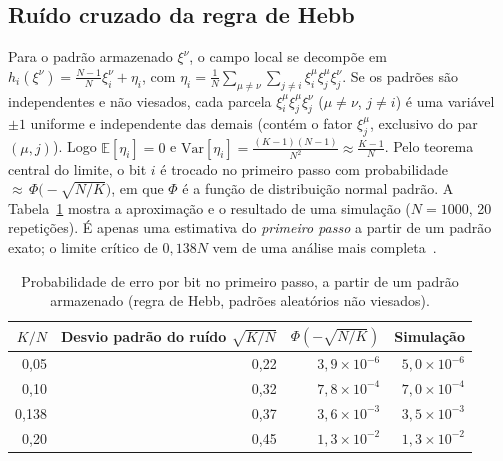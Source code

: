 \subsection{Ruído cruzado da regra de Hebb}
Para o padrão armazenado $\xi^\nu$, o campo local se decompõe em
$h_i(\xi^\nu)=\tfrac{N-1}{N}\xi_i^\nu+\eta_i$, com
$\eta_i=\tfrac1N\sum_{\mu\neq\nu}\sum_{j\neq i}\xi_i^\mu\xi_j^\mu\xi_j^\nu$. Se os padrões são independentes e não
viesados, cada parcela $\xi_i^\mu\xi_j^\mu\xi_j^\nu$ ($\mu\neq\nu$, $j\neq i$) é uma variável $\pm1$ uniforme e
independente das demais (contém o fator $\xi_j^\mu$, exclusivo do par $(\mu,j)$). Logo $\mathbb E[\eta_i]=0$ e
$\mathrm{Var}[\eta_i]=\tfrac{(K-1)(N-1)}{N^2}\approx\tfrac{K-1}{N}$. Pelo teorema central do limite, o bit $i$ é
trocado no primeiro passo com probabilidade ${\approx}\,\Phi\bigl(-\sqrt{N/K}\bigr)$, em que $\Phi$ é a função de
distribuição normal padrão. A Tabela~\ref{tab:ruido} mostra a aproximação e o resultado de uma simulação
($N=1000$, 20 repetições). É apenas uma estimativa do \emph{primeiro passo} a partir de um padrão exato; o
limite crítico de $0{,}138N$ vem de uma análise mais completa~\cite{hertz1991}.
\begin{table}[htbp]
\centering
\caption{Probabilidade de erro por bit no primeiro passo, a partir de um padrão armazenado (regra de Hebb,
padrões aleatórios não viesados).}
\label{tab:ruido}
\small
\begin{tabular}{@{}rrrr@{}}
\toprule
$K/N$ & Desvio padrão do ruído $\sqrt{K/N}$ & $\Phi(-\sqrt{N/K})$ & Simulação\\
\midrule
0,05  & 0,22 & $3{,}9\times10^{-6}$ & $5{,}0\times10^{-6}$\\
0,10  & 0,32 & $7{,}8\times10^{-4}$ & $7{,}0\times10^{-4}$\\
0,138 & 0,37 & $3{,}6\times10^{-3}$ & $3{,}5\times10^{-3}$\\
0,20  & 0,45 & $1{,}3\times10^{-2}$ & $1{,}3\times10^{-2}$\\
\bottomrule
\end{tabular}
\end{table}

